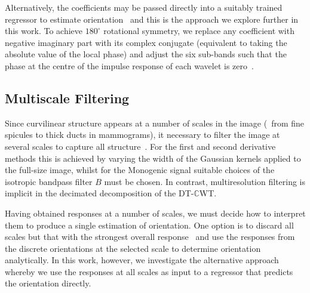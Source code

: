 \documentclass[10pt,twocolumn,letterpaper]{article}
\def\dtcwt{DT-$\mathbb{C}$WT}
\newcommand{\comment}[1]{}
\begin{document}
Alternatively, the coefficients may be passed directly into a suitably trained regressor to estimate orientation~\cite{Berks_etal_IPMI11} and this is the approach we explore further in this work. To achieve $180^\circ$ rotational symmetry, we replace any coefficient with negative imaginary part with its complex conjugate (equivalent to taking the absolute value of the local phase) and adjust the six sub-bands such that the phase at the centre of the impulse response of each wavelet is zero~\cite{Kingsbury_ECSP06,Berks_etal_IPMI11}.

\comment{When dealing with a complex response, $c$, we separate its magnitude, $|c|$, from its phase, $\angle c$. Since orientation is only defined up to a rotation of $180^\circ$, however, a point with phase $\phi$ displaced by $d$ from the centre of a line is indistinguishable from a point with phase $-\phi$ displaced by $-d$ from the same line when looking in the opposite direction; we therefore take the absolute value of phase, $|\angle c|$, at each pixel.}


\subsection{Multiscale Filtering}
Since curvilinear structure appears at a number of scales in the image (\eg~from fine spicules to thick ducts in mammograms), it necessary to filter the image at several scales to capture all structure~\cite{Lindeberg_IJCV98b}. For the first and second derivative methods this is achieved  by varying the width of the Gaussian kernels applied to the full-size image, whilst for the Monogenic signal suitable choices of the isotropic bandpass filter $B$ must be chosen. In contrast, multiresolution filtering is implicit in the decimated decomposition of the \dtcwt.

Having obtained responses at a number of scales, we must decide how to interpret them to produce a single estimation of orientation. One option is to discard all scales but that with the strongest overall response~\cite{Karssemeijer_teBrake_TMI96} and use the responses from the discrete orientations at the selected scale to determine orientation analytically. In this work, however, we investigate the alternative approach whereby we use the responses at all scales as input to a regressor that predicts the orientation directly. \comment{This general purpose approach has the added advantage that it can be applied for filter banks where an analytic solution is not obvious (such as the \dtcwt).}
\end{document}
